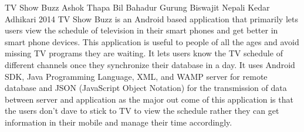  \begin{conf-abstract}[]
{TV Show Buzz}
{Ashok Thapa
Bil Bahadur Gurung
Biswajit Nepali
Kedar Adhikari}
{2014}
TV Show Buzz is an Android based application that primarily lets users view the schedule of television in their smart phones and get better in smart phone devices. This application is useful to people of all the ages and avoid missing TV programs they are waiting. It lets users know the TV schedule of different channels once they synchronize their database in a day. It uses Android SDK, Java Programming Language, XML, and WAMP server for remote database and JSON (JavaScript Object Notation) for the transmission of data between server and application as the major out come of this application is that the users don't dave to stick to TV to view the schedule rather they can get information in their mobile and manage their time accordingly.
  \end{conf-abstract}